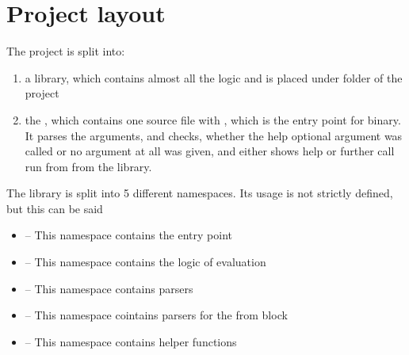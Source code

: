 \section{Project layout}

The project is split into:
\begin{enumerate}
  \item a library, which contains almost all the logic and is placed under
        folder of the project

  \item the , which contains one source file
      with , which is the entry point for  binary. 
      It parses the arguments, and checks, whether the help optional argument was called or no argument at all was given, 
      and either shows help or further call run from  from the library.
\end{enumerate}

The library is split into 5 different namespaces. Its usage is not strictly defined, but this can be said
\begin{itemize}
    \item {} -- This namespace contains the entry point
    \item {} -- This namespace contains the logic of evaluation
    \item {} -- This namespace contains parsers
    \item {} -- This namespace cointains parsers for the from block
    \item {} -- This namespace contains helper functions
\end{itemize}

